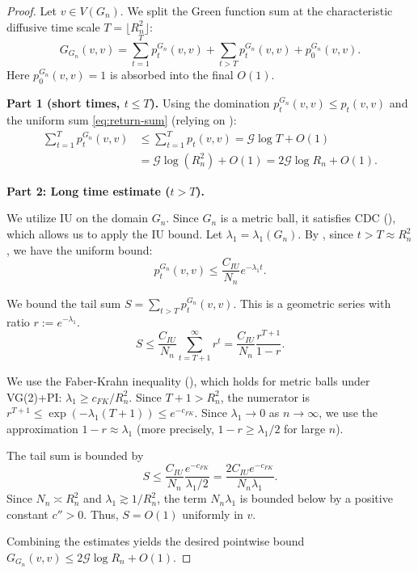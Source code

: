 \documentclass{article}
\numberwithin{equation}{section}
\theoremstyle{definition}
\theoremstyle{remark}
\newcommand{\cG}{\mathcal{G}}
\begin{document}
\begin{proof}
Let $v \in V(G_n)$. We split the Green function sum at the characteristic diffusive time scale $T = \lfloor R_n^2 \rfloor$:
\[
G_{G_n}(v,v) = \sum_{t=1}^{T} p_t^{G_n}(v,v) + \sum_{t > T} p_t^{G_n}(v,v) + p_0^{G_n}(v,v).
\]
Here $p_0^{G_n}(v,v)=1$ is absorbed into the final $O(1)$.

\textbf{Part 1 (short times, $t\le T$).} Using the domination $p_t^{G_n}(v,v)\le p_t(v,v)$ and the uniform sum \eqref{eq:return-sum} (relying on ):
\begin{align*}
\sum_{t=1}^{T} p_t^{G_n}(v,v) &\leq \sum_{t=1}^{T} p_t(v,v) = \cG \log T + O(1) \\
&= \cG \log(R_n^2) + O(1) = 2\cG \log R_n + O(1).
\end{align*}

\textbf{Part 2: Long time estimate ($t > T$).}

We utilize IU on the domain $G_n$. Since $G_n$ is a metric ball, it satisfies CDC (), which allows us to apply the IU bound. Let $\lambda_1 = \lambda_1(G_n)$. By , since $t > T \approx R_n^2$, we have the uniform bound:
\begin{equation}
p_t^{G_n}(v,v) \leq \frac{C_{IU}}{N_n} e^{-\lambda_1 t}.
\end{equation}

We bound the tail sum $S = \sum_{t > T} p_t^{G_n}(v,v)$. This is a geometric series with ratio $r:=e^{-\lambda_1}$.
\[
S \leq \frac{C_{IU}}{N_n} \sum_{t=T+1}^\infty r^t = \frac{C_{IU}}{N_n} \frac{r^{T+1}}{1-r}.
\]

We use the Faber-Krahn inequality (), which holds for metric balls under VG(2)+PI: $\lambda_1 \geq c_{FK}/R_n^2$. Since $T+1 > R_n^2$, the numerator is $r^{T+1} \leq \exp(-\lambda_1(T+1)) \leq e^{-c_{FK}}$. Since $\lambda_1 \to 0$ as $n \to \infty$, we use the approximation $1-r \approx \lambda_1$ (more precisely, $1-r \geq \lambda_1/2$ for large $n$).

The tail sum is bounded by
\[
S \leq \frac{C_{IU}}{N_n} \frac{e^{-c_{FK}}}{\lambda_1/2} = \frac{2 C_{IU} e^{-c_{FK}}}{N_n \lambda_1}.
\]
Since $N_n \asymp R_n^2$ and $\lambda_1 \gtrsim 1/R_n^2$, the term $N_n \lambda_1$ is bounded below by a positive constant $c''>0$. Thus, $S = O(1)$ uniformly in $v$.

Combining the estimates yields the desired pointwise bound $G_{G_n}(v,v) \leq 2\cG \log R_n + O(1)$.
\end{proof}
\end{document}
